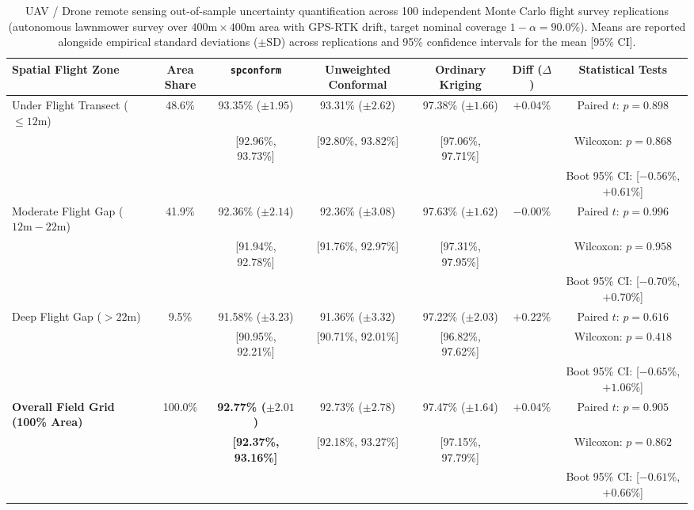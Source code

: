 \begin{table}[t!]
\centering
\small
\caption{UAV / Drone remote sensing out-of-sample uncertainty quantification across 100 independent Monte Carlo flight survey replications (autonomous lawnmower survey over $400\text{m} \times 400\text{m}$ area with GPS-RTK drift, target nominal coverage $1-\alpha = 90.0\%$). Means are reported alongside empirical standard deviations ($\pm\text{SD}$) across replications and 95\% confidence intervals for the mean [$95\%\text{ CI}$].}
\label{tab:drone_monte_carlo_100splits}
\begin{tabular}{lcccccc}
\toprule
\textbf{Spatial Flight Zone} & \textbf{Area Share} & \textbf{\texttt{spconform}} & \textbf{Unweighted Conformal} & \textbf{Ordinary Kriging} & \textbf{Diff ($\Delta$)} & \textbf{Statistical Tests} \\
\midrule
Under Flight Transect ($\le 12\text{m}$) & 48.6\% & 93.35\% ($\pm 1.95$) & 93.31\% ($\pm 2.62$) & 97.38\% ($\pm 1.66$) & $+0.04\%$ & Paired $t$: $p = 0.898$ \\
 & & [92.96\%, 93.73\%] & [92.80\%, 93.82\%] & [97.06\%, 97.71\%] & & Wilcoxon: $p = 0.868$ \\
 & & & & & & Boot 95\% CI: [$-0.56$\%, $+0.61$\%] \\
\midrule
Moderate Flight Gap ($12\text{m} - 22\text{m}$) & 41.9\% & 92.36\% ($\pm 2.14$) & 92.36\% ($\pm 3.08$) & 97.63\% ($\pm 1.62$) & $-0.00\%$ & Paired $t$: $p = 0.996$ \\
 & & [91.94\%, 92.78\%] & [91.76\%, 92.97\%] & [97.31\%, 97.95\%] & & Wilcoxon: $p = 0.958$ \\
 & & & & & & Boot 95\% CI: [$-0.70$\%, $+0.70$\%] \\
\midrule
Deep Flight Gap ($> 22\text{m}$) & 9.5\% & 91.58\% ($\pm 3.23$) & 91.36\% ($\pm 3.32$) & 97.22\% ($\pm 2.03$) & $+0.22\%$ & Paired $t$: $p = 0.616$ \\
 & & [90.95\%, 92.21\%] & [90.71\%, 92.01\%] & [96.82\%, 97.62\%] & & Wilcoxon: $p = 0.418$ \\
 & & & & & & Boot 95\% CI: [$-0.65$\%, $+1.06$\%] \\
\midrule
\textbf{Overall Field Grid (100\% Area)} & 100.0\% & \textbf{92.77\% ($\pm 2.01$)} & 92.73\% ($\pm 2.78$) & 97.47\% ($\pm 1.64$) & $+0.04\%$ & Paired $t$: $p = 0.905$ \\
 & & \textbf{[92.37\%, 93.16\%]} & [92.18\%, 93.27\%] & [97.15\%, 97.79\%] & & Wilcoxon: $p = 0.862$ \\
 & & & & & & Boot 95\% CI: [$-0.61$\%, $+0.66$\%] \\

\end{tabular}
\end{table}
